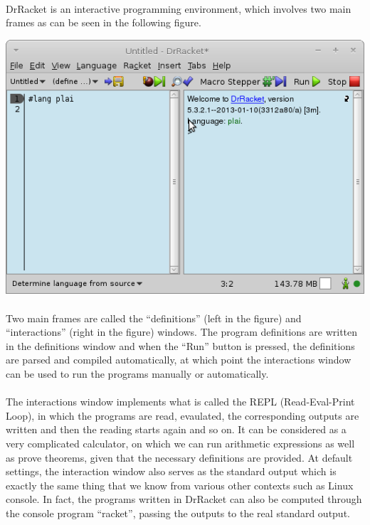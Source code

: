 \documentclass[11pt]{report}
\begin{document}
\begin{appendices}
\paragraph{} DrRacket is an interactive programming environment, which involves two main frames as can be seen in the following figure.

\begin{center}
\includegraphics[scale=0.75]{DrracketMain.png}
\end{center}

\paragraph{} Two main frames are called the ``definitions'' (left in the figure) and ``interactions'' (right in the figure) windows. The program definitions are written in the definitions window and when the ``Run'' button is pressed, the definitions are parsed and compiled automatically, at which point the interactions window can be used to run the programs manually or automatically.

\paragraph{} The interactions window implements what is called the REPL (Read-Eval-Print Loop), in which the programs are read, evaulated, the corresponding outputs are written and then the reading starts again and so on. It can be considered as a very complicated calculator, on which we can run arithmetic expressions as well as prove theorems, given that the necessary definitions are provided. At default settings, the interaction window also serves as the standard output which is exactly the same thing that we know from various other contexts such as Linux console. In fact, the programs written in DrRacket can also be computed through the console program ``racket'', passing the outputs to the real standard output.


\end{appendices}
\end{document}
